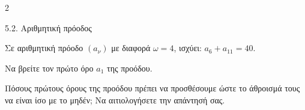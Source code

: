 \begin{ylh}{2}
    \item 5.2. Αριθμητική πρόοδος
\end{ylh}
Σε αριθμητική πρόοδο $(a_\nu)$ με διαφορά $\omega = 4$, ισχύει: $a_6 + a_{11} = 40$.

\begin{alist}
\item Να βρείτε τον πρώτο όρο $a_1$ της προόδου. 
\item Πόσους πρώτους όρους της προόδου πρέπει να προσθέσουμε ώστε το άθροισμά τους να είναι ίσο με το μηδέν; Να αιτιολογήσετε την απάντησή σας. 
\end{alist}


